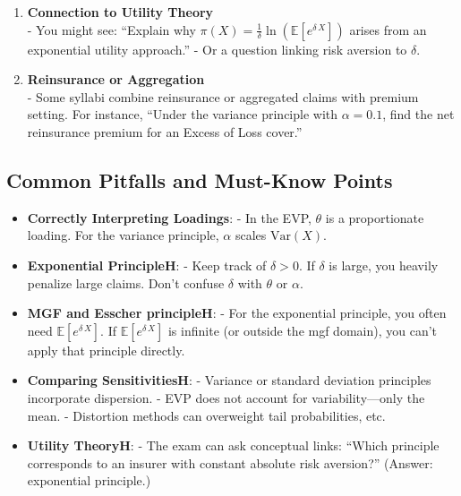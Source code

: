 \documentclass[13pt,a4paper]{article}
\begin{document}
\begin{enumerate}
  \item \textbf{Connection to Utility Theory}\\
    - You might see: “Explain why \(\pi(X)=\frac{1}{\delta}\ln(\mathbb{E}[e^{\delta\,X}])\) arises from an exponential utility approach.”  
    - Or a question linking risk aversion to \(\delta\).

  \item \textbf{Reinsurance or Aggregation}\\
    - Some syllabi combine reinsurance or aggregated claims with premium setting. For instance, “Under the variance principle with \(\alpha=0.1\), find the net reinsurance premium for an Excess of Loss cover.”

\end{enumerate}

\subsection{Common Pitfalls and Must-Know Points}
\begin{itemize}
  \item \textbf{Correctly Interpreting Loadings}: 
    - In the EVP, \(\theta\) is a proportionate loading. For the variance principle, \(\alpha\) scales \(\mathrm{Var}(X)\).  
  \item \textbf{Exponential PrincipleH}: 
    - Keep track of \(\delta>0\). If \(\delta\) is large, you heavily penalize large claims. Don’t confuse \(\delta\) with \(\theta\) or \(\alpha\).
  \item \textbf{MGF and Esscher principleH}:
    - For the exponential principle, you often need \(\mathbb{E}[e^{\delta\,X}]\). If \(\mathbb{E}[e^{\delta\,X}]\) is infinite (or outside the mgf domain), you can’t apply that principle directly.
  \item \textbf{Comparing SensitivitiesH}:
    - Variance or standard deviation principles incorporate dispersion. 
    - EVP does not account for variability—only the mean. 
    - Distortion methods can overweight tail probabilities, etc.
  \item \textbf{Utility TheoryH}:
    - The exam can ask conceptual links: “Which principle corresponds to an insurer with constant absolute risk aversion?” (Answer: exponential principle.)
\end{itemize}
\end{document}
